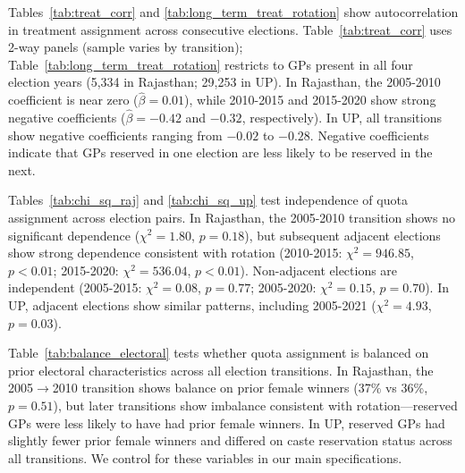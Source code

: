 \documentclass[12pt]{article}
\begin{document}
\begin{table}[!htbp]
    \centering
    \caption{Treatment Rotation: Quota Assignment Correlation Across Election Cycles (2-Way Panel)}
    \label{tab:treat_corr}
    
\end{table}

\begin{table}[!htbp]
    \centering
    \caption{Treatment Rotation: Quota Assignment Correlation Across Election Cycles (4-Way Panel)}
    \label{tab:long_term_treat_rotation}
    
\end{table}
\FloatBarrier

Tables~\ref{tab:treat_corr} and \ref{tab:long_term_treat_rotation} show autocorrelation in treatment assignment across consecutive elections. Table~\ref{tab:treat_corr} uses 2-way panels (sample varies by transition); Table~\ref{tab:long_term_treat_rotation} restricts to GPs present in all four election years (5,334 in Rajasthan; 29,253 in UP). In Rajasthan, the 2005-2010 coefficient is near zero ($\hat{\beta} = 0.01$), while 2010-2015 and 2015-2020 show strong negative coefficients ($\hat{\beta} = -0.42$ and $-0.32$, respectively). In UP, all transitions show negative coefficients ranging from $-0.02$ to $-0.28$. Negative coefficients indicate that GPs reserved in one election are less likely to be reserved in the next.

Tables~\ref{tab:chi_sq_raj} and \ref{tab:chi_sq_up} test independence of quota assignment across election pairs. In Rajasthan, the 2005-2010 transition shows no significant dependence ($\chi^2 = 1.80$, $p = 0.18$), but subsequent adjacent elections show strong dependence consistent with rotation (2010-2015: $\chi^2 = 946.85$, $p < 0.01$; 2015-2020: $\chi^2 = 536.04$, $p < 0.01$). Non-adjacent elections are independent (2005-2015: $\chi^2 = 0.08$, $p = 0.77$; 2005-2020: $\chi^2 = 0.15$, $p = 0.70$). In UP, adjacent elections show similar patterns, including 2005-2021 ($\chi^2 = 4.93$, $p = 0.03$).


\FloatBarrier


\FloatBarrier

Table~\ref{tab:balance_electoral} tests whether quota assignment is balanced on prior electoral characteristics across all election transitions. In Rajasthan, the 2005$\rightarrow$2010 transition shows balance on prior female winners (37\% vs 36\%, $p = 0.51$), but later transitions show imbalance consistent with rotation---reserved GPs were less likely to have had prior female winners. In UP, reserved GPs had slightly fewer prior female winners and differed on caste reservation status across all transitions. We control for these variables in our main specifications.
\end{document}
